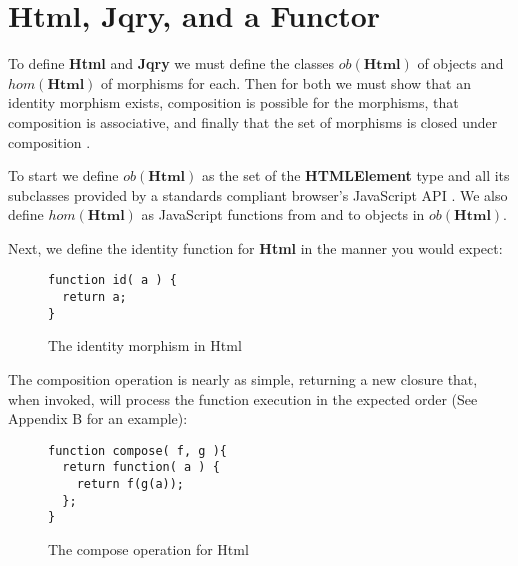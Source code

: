 \documentclass[preprint]{sigplanconf}
\begin{document}
\section{Html, Jqry, and a Functor}

To define \textbf{Html} and \textbf{Jqry} we must define the classes \begin{math}ob(\mathbf{Html})\end{math} of objects and \begin{math}hom(\mathbf{Html})\end{math} of morphisms for each. Then for both we must show that an identity morphism exists, composition is possible for the morphisms, that composition is associative, and finally that the set of morphisms is closed under composition \cite[p. ~1]{bib:category-definition}.

To start we define \begin{math}ob(\mathbf{Html})\end{math} as the set of the \textbf{HTMLElement} type and all its subclasses provided by a standards compliant browser's JavaScript API \cite{bib:htmlelement, bib:all-htmlelements}. We also define \begin{math}hom(\mathbf{Html})\end{math} as JavaScript functions from and to objects in \begin{math}ob(\mathbf{Html})\end{math}.

Next, we define the identity function for \textbf{Html} in the manner you would expect:

\begin{figure}[!ht]
\small
\begin{verbatim}
function id( a ) {
  return a;
}
\end{verbatim}
\nocaptionrule \caption{The identity morphism in Html}
\end{figure}

The composition operation is nearly as simple, returning a new closure that, when invoked, will process the function execution in the expected order (See Appendix B for an example):

\begin{figure}[!ht]
\small
\begin{verbatim}
function compose( f, g ){
  return function( a ) {
    return f(g(a));
  };
}
\end{verbatim}
\nocaptionrule \caption{The compose operation for Html}
\end{figure}
\end{document}
